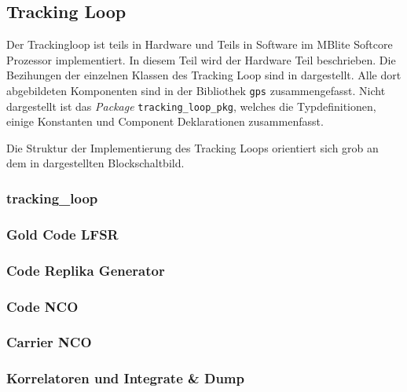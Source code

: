 \subsection{Tracking Loop}
Der Trackingloop ist teils in Hardware und Teils in Software im MBlite Softcore Prozessor implementiert. In diesem Teil wird der Hardware Teil beschrieben. Die Bezihungen der einzelnen Klassen des Tracking Loop sind in  dargestellt. Alle dort abgebildeten Komponenten sind in der Bibliothek \lstinline$gps$ zusammengefasst. Nicht dargestellt ist das \emph{Package} \lstinline$tracking_loop_pkg$, welches die Typdefinitionen, einige Konstanten und Component Deklarationen zusammenfasst.

Die Struktur der Implementierung des Tracking Loops orientiert sich grob an dem in  dargestellten Blockschaltbild.


\subsubsection{tracking\_loop}
\subsubsection{Gold Code LFSR}
\subsubsection{Code Replika Generator}
\subsubsection{Code NCO}
\subsubsection{Carrier NCO}
\subsubsection{Korrelatoren und Integrate \& Dump}